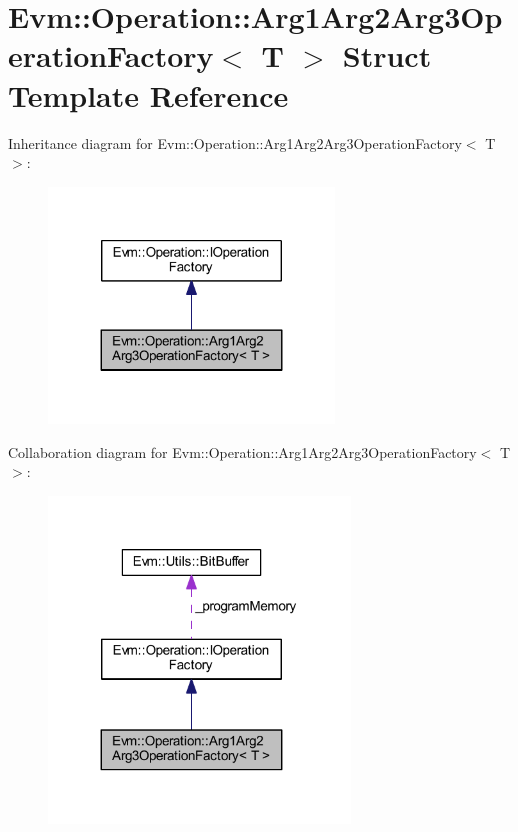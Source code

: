 \hypertarget{struct_evm_1_1_operation_1_1_arg1_arg2_arg3_operation_factory}{}\section{Evm\+:\+:Operation\+:\+:Arg1\+Arg2\+Arg3\+Operation\+Factory$<$ T $>$ Struct Template Reference}
\label{struct_evm_1_1_operation_1_1_arg1_arg2_arg3_operation_factory}


Inheritance diagram for Evm\+:\+:Operation\+:\+:Arg1\+Arg2\+Arg3\+Operation\+Factory$<$ T $>$\+:
\nopagebreak
\begin{figure}[H]
\begin{center}
\leavevmode
\includegraphics[width=215pt]{struct_evm_1_1_operation_1_1_arg1_arg2_arg3_operation_factory__inherit__graph}
\end{center}
\end{figure}


Collaboration diagram for Evm\+:\+:Operation\+:\+:Arg1\+Arg2\+Arg3\+Operation\+Factory$<$ T $>$\+:
\nopagebreak
\begin{figure}[H]
\begin{center}
\leavevmode
\includegraphics[width=227pt]{struct_evm_1_1_operation_1_1_arg1_arg2_arg3_operation_factory__coll__graph}
\end{center}
\end{figure}
